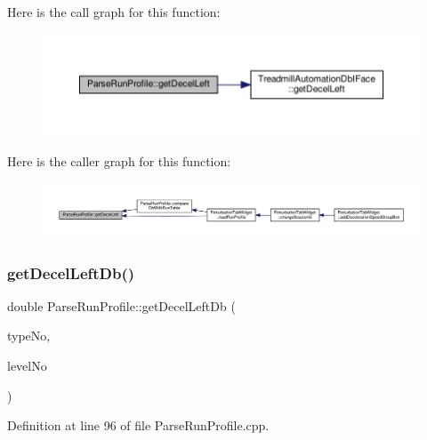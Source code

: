 Here is the call graph for this function\+:
\nopagebreak
\begin{figure}[H]
\begin{center}
\leavevmode
\includegraphics[width=350pt]{class_parse_run_profile_a7ce3d630a0ea5925525ee902f25d44e1_cgraph}
\end{center}
\end{figure}
Here is the caller graph for this function\+:
\nopagebreak
\begin{figure}[H]
\begin{center}
\leavevmode
\includegraphics[width=350pt]{class_parse_run_profile_a7ce3d630a0ea5925525ee902f25d44e1_icgraph}
\end{center}
\end{figure}
\mbox{\label{class_parse_run_profile_a4b1aad790977725a7daf4fff854b0cb6}} 
\subsubsection{\texorpdfstring{get\+Decel\+Left\+Db()}{getDecelLeftDb()}}
{\footnotesize\ttfamily double Parse\+Run\+Profile\+::get\+Decel\+Left\+Db (\begin{DoxyParamCaption}\item[{Q\+String}]{type\+No,  }\item[{Q\+String}]{level\+No }\end{DoxyParamCaption})}



Definition at line 96 of file Parse\+Run\+Profile.\+cpp.

